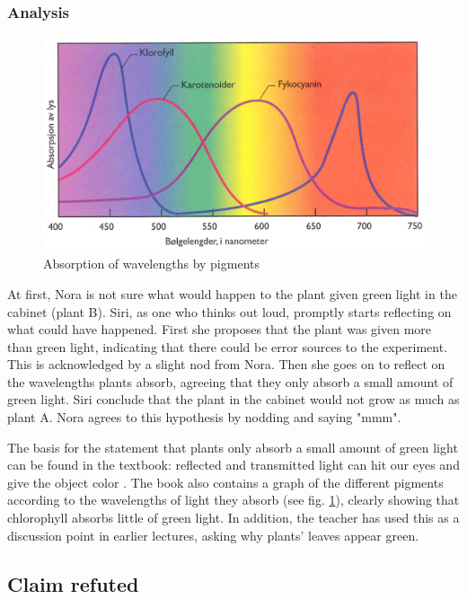 \subsubsection*{Analysis}
\begin{figure}
\centering
\includegraphics[width=\textwidth]{img/dataandanalasys/absorbtion.png}
\caption{Absorption of wavelengths by pigments \citep{bios}}
\label{fig:absorption}
\end{figure}
At first, Nora is not sure what would happen to the plant given green light in the cabinet (plant B). Siri, as one who thinks out loud, promptly starts reflecting on what could have happened. First she proposes that the plant was given more than green light, indicating that there could be error sources to the experiment. This is acknowledged by a slight nod from Nora. Then she goes on to reflect on the wavelengths plants absorb, agreeing that they only absorb a small amount of green light. Siri conclude that the plant in the cabinet would not grow as much as plant A. Nora agrees to this hypothesis by nodding and saying "mmm". 

The basis for the statement that plants only absorb a small amount of green light can be found in the textbook: reflected and transmitted light can hit our eyes and give the object color \citep[pg. 103]{bios}. The book also contains a graph of the different pigments according to the wavelengths of light they absorb (see fig. \ref{fig:absorption}), clearly showing that chlorophyll absorbs little of green light. In addition, the teacher has used this as a discussion point in earlier lectures, asking why plants' leaves appear green. 

\subsection{Claim refuted}

